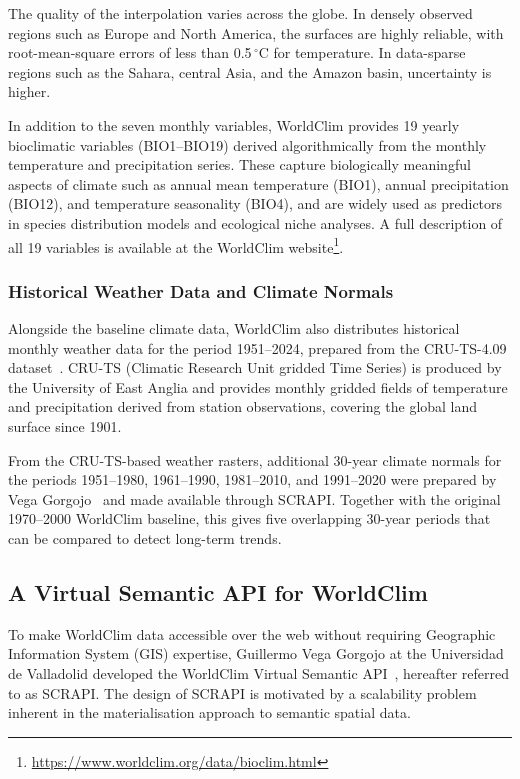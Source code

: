 The quality of the interpolation varies across the globe. In densely observed
regions such as Europe and North America, the surfaces are highly reliable, with
root-mean-square errors of less than 0.5\,$^\circ$C for temperature. In
data-sparse regions such as the Sahara, central Asia, and the Amazon basin,
uncertainty is higher.

In addition to the seven monthly variables, WorldClim provides 19 yearly
bioclimatic variables (BIO1--BIO19) derived algorithmically from the monthly
temperature and precipitation series. These capture biologically meaningful
aspects of climate such as annual mean temperature (BIO1), annual precipitation
(BIO12), and temperature seasonality (BIO4), and are widely used as predictors
in species distribution models and ecological niche analyses. A full description
of all 19 variables is available at the WorldClim
website\footnote{\url{https://www.worldclim.org/data/bioclim.html}}.

\subsubsection{Historical Weather Data and Climate Normals}\label{REL_WORLDCLIM_PERIODS}

Alongside the baseline climate data, WorldClim also distributes historical
monthly weather data for the period 1951--2024, prepared from the CRU-TS-4.09
dataset~\cite{harris2020cru}. CRU-TS (Climatic Research Unit gridded Time
Series) is produced by the University of East Anglia and provides monthly
gridded fields of temperature and precipitation derived from station
observations, covering the global land surface since 1901.

From the CRU-TS-based weather rasters, additional 30-year climate normals for
the periods 1951--1980, 1961--1990, 1981--2010, and 1991--2020 were prepared
by Vega Gorgojo~\cite{scrapi} and made available through SCRAPI. Together with
the original 1970--2000 WorldClim baseline, this gives five overlapping 30-year
periods that can be compared to detect long-term trends.

\subsection{A Virtual Semantic API for WorldClim}\label{REL_WORLDCLIM_API}

To make WorldClim data accessible over the web without requiring Geographic
Information System (GIS) expertise, Guillermo Vega Gorgojo at the Universidad
de Valladolid developed the WorldClim Virtual Semantic API~\cite{scrapi},
hereafter referred to as SCRAPI. The design of SCRAPI is motivated by a
scalability problem inherent in the materialisation approach to semantic spatial
data.

